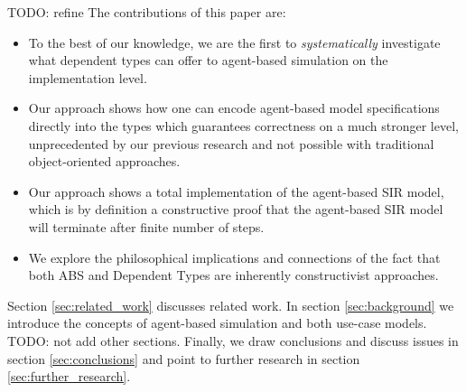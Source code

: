 TODO: refine
The contributions of this paper are:
\begin{itemize}
	\item To the best of our knowledge, we are the first to \textit{systematically} investigate what dependent types can offer to agent-based simulation on the implementation level.
	\item Our approach shows how one can encode agent-based model specifications directly into the types which guarantees correctness on a much stronger level, unprecedented by our previous research and not possible with traditional object-oriented approaches.
	\item Our approach shows a total implementation of the agent-based SIR model, which is by definition a constructive proof that the agent-based SIR model will terminate after finite number of steps.
	\item We explore the philosophical implications and connections of the fact that both ABS and Dependent Types are inherently constructivist approaches. 
\end{itemize}

Section \ref{sec:related_work} discusses related work. In section \ref{sec:background} we introduce the concepts of agent-based simulation and both use-case models. TODO: not add other sections. Finally, we draw conclusions and discuss issues in section \ref{sec:conclusions} and point to further research in section \ref{sec:further_research}.